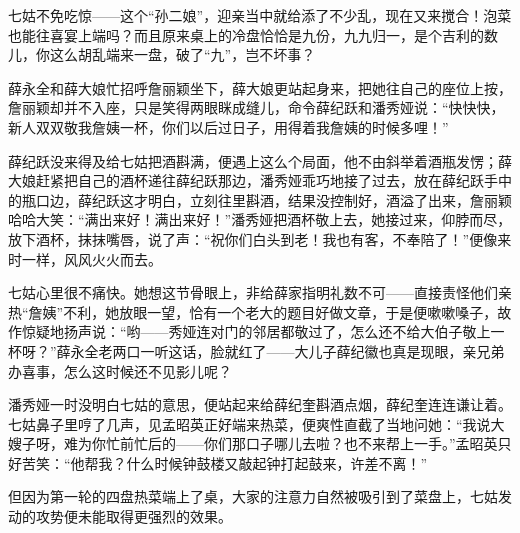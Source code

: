 \par 七姑不免吃惊——这个“孙二娘”，迎亲当中就给添了不少乱，现在又来搅合！泡菜也能往喜宴上端吗？而且原来桌上的冷盘恰恰是九份，九九归一，是个吉利的数儿，你这么胡乱端来一盘，破了“九”，岂不坏事？
\par 薛永全和薛大娘忙招呼詹丽颖坐下，薛大娘更站起身来，把她往自己的座位上按，詹丽颖却并不入座，只是笑得两眼眯成缝儿，命令薛纪跃和潘秀娅说：“快快快，新人双双敬我詹姨一杯，你们以后过日子，用得着我詹姨的时候多哩！”
\par 薛纪跃没来得及给七姑把酒斟满，便遇上这么个局面，他不由斜举着酒瓶发愣；薛大娘赶紧把自己的酒杯递往薛纪跃那边，潘秀娅乖巧地接了过去，放在薛纪跃手中的瓶口边，薛纪跃这才明白，立刻往里斟酒，结果没控制好，酒溢了出来，詹丽颖哈哈大笑：“满出来好！满出来好！”潘秀娅把酒杯敬上去，她接过来，仰脖而尽，放下酒杯，抹抹嘴唇，说了声：“祝你们白头到老！我也有客，不奉陪了！”便像来时一样，风风火火而去。
\par 七姑心里很不痛快。她想这节骨眼上，非给薛家指明礼数不可——直接责怪他们亲热“詹姨”不利，她放眼一望，恰有一个老大的题目好做文章，于是便嗽嗽嗓子，故作惊疑地扬声说：“哟——秀娅连对门的邻居都敬过了，怎么还不给大伯子敬上一杯呀？”薛永全老两口一听这话，脸就红了——大儿子薛纪徽也真是现眼，亲兄弟办喜事，怎么这时候还不见影儿呢？
\par 潘秀娅一时没明白七姑的意思，便站起来给薛纪奎斟酒点烟，薛纪奎连连谦让着。七姑鼻子里哼了几声，见孟昭英正好端来热菜，便爽性直截了当地问她：“我说大嫂子呀，难为你忙前忙后的——你们那口子哪儿去啦？也不来帮上一手。”孟昭英只好苦笑：“他帮我？什么时候钟鼓楼又敲起钟打起鼓来，许差不离！”
\par 但因为第一轮的四盘热菜端上了桌，大家的注意力自然被吸引到了菜盘上，七姑发动的攻势便未能取得更强烈的效果。
